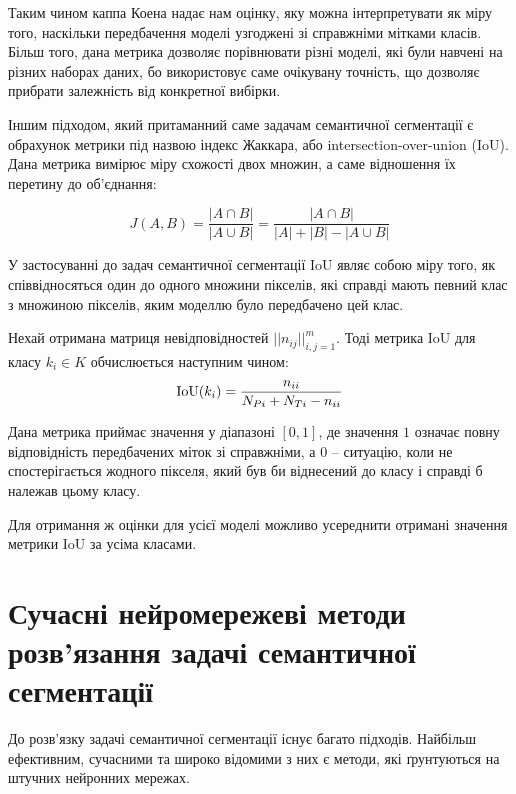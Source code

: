 Таким чином каппа Коена надає нам оцінку, яку можна інтерпретувати як
міру того, наскільки передбачення моделі узгоджені зі справжніми
мітками класів. Більш того, дана метрика дозволяє порівнювати різні моделі,
які були навчені на різних наборах даних, бо використовує саме
очікувану точність, що дозволяє прибрати залежність від конкретної вибірки.

Іншим підходом, який притаманний саме задачам семантичної сегментації
є обрахунок метрики під назвою індекс Жаккара, або intersection-over-union (IoU).
Дана метрика вимірює міру схожості двох множин, а саме відношення їх
перетину до об'єднання:

\begin{equation*}
    J(A, B) = \frac{|A \cap B|}{|A \cup B|} =
    \frac{|A \cap B|}{|A| + |B| - |A \cup B|}
\end{equation*}

У застосуванні до задач семантичної сегментації IoU являє собою
міру того, як співвідносяться один до одного множини пікселів,
які справді мають певний клас з множиною пікселів, яким моделлю
було передбачено цей клас.

\begin{definition}[IoU]\label{def:iou}
    Нехай отримана матриця невідповідностей $||n_{ij}||_{i,j=1}^m$.
    Тоді метрика IoU для класу $k_i \in K$ обчислюється наступним чином:
    \begin{equation*}
        \operatorname{IoU}(k_i) = \frac{n_{ii}}{N_{Pi} + N_{Ti} - n_{ii}}
    \end{equation*}
\end{definition}

Дана метрика приймає значення у діапазоні $[0, 1]$, де
значення $1$ означає повну відповідність передбачених міток
зі справжніми, а $0$ --  ситуацію, коли не спостерігається
жодного пікселя, який був би віднесений до класу і справді б
належав цьому класу.

Для отримання ж оцінки для усієї моделі можливо усереднити отримані
значення метрики IoU за усіма класами.

\section{Сучасні нейромережеві методи розв'язання задачі семантичної сегментації}

До розв'язку задачі семантичної сегментації існує багато підходів.
Найбільш ефективним, сучасними та широко відомими з них є методи, які
ґрунтуються на штучних нейронних мережах.

